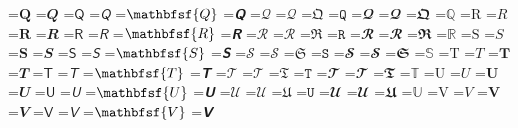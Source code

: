 \documentclass{article}
\begin{document}
=\hbox{$\mathbf{Q}$}
=\hbox{$\mathbfit{Q}$}
=\hbox{$\mathsf{Q}$}
=\hbox{$\mathsfit{Q}$}
=\hbox{$\mathbfsf{Q}$}
=\hbox{$\mathbfsfit{Q}$}
=\hbox{$\mathcal{Q}$}
=\hbox{$\mathscr{Q}$}
=\hbox{$\mathfrak{Q}$}
=\hbox{$\mathtt{Q}$}
=\hbox{$\mathbfcal{Q}$}
=\hbox{$\mathbfscr{Q}$}
=\hbox{$\mathbffrak{Q}$}
=\hbox{$\mathbb{Q}$}
=\hbox{$\mathrm{R}$}
=\hbox{$\mathit{R}$}
=\hbox{$\mathbf{R}$}
=\hbox{$\mathbfit{R}$}
=\hbox{$\mathsf{R}$}
=\hbox{$\mathsfit{R}$}
=\hbox{$\mathbfsf{R}$}
=\hbox{$\mathbfsfit{R}$}
=\hbox{$\mathcal{R}$}
=\hbox{$\mathscr{R}$}
=\hbox{$\mathfrak{R}$}
=\hbox{$\mathtt{R}$}
=\hbox{$\mathbfcal{R}$}
=\hbox{$\mathbfscr{R}$}
=\hbox{$\mathbffrak{R}$}
=\hbox{$\mathbb{R}$}
=\hbox{$\mathrm{S}$}
=\hbox{$\mathit{S}$}
=\hbox{$\mathbf{S}$}
=\hbox{$\mathbfit{S}$}
=\hbox{$\mathsf{S}$}
=\hbox{$\mathsfit{S}$}
=\hbox{$\mathbfsf{S}$}
=\hbox{$\mathbfsfit{S}$}
=\hbox{$\mathcal{S}$}
=\hbox{$\mathscr{S}$}
=\hbox{$\mathfrak{S}$}
=\hbox{$\mathtt{S}$}
=\hbox{$\mathbfcal{S}$}
=\hbox{$\mathbfscr{S}$}
=\hbox{$\mathbffrak{S}$}
=\hbox{$\mathbb{S}$}
=\hbox{$\mathrm{T}$}
=\hbox{$\mathit{T}$}
=\hbox{$\mathbf{T}$}
=\hbox{$\mathbfit{T}$}
=\hbox{$\mathsf{T}$}
=\hbox{$\mathsfit{T}$}
=\hbox{$\mathbfsf{T}$}
=\hbox{$\mathbfsfit{T}$}
=\hbox{$\mathcal{T}$}
=\hbox{$\mathscr{T}$}
=\hbox{$\mathfrak{T}$}
=\hbox{$\mathtt{T}$}
=\hbox{$\mathbfcal{T}$}
=\hbox{$\mathbfscr{T}$}
=\hbox{$\mathbffrak{T}$}
=\hbox{$\mathbb{T}$}
=\hbox{$\mathrm{U}$}
=\hbox{$\mathit{U}$}
=\hbox{$\mathbf{U}$}
=\hbox{$\mathbfit{U}$}
=\hbox{$\mathsf{U}$}
=\hbox{$\mathsfit{U}$}
=\hbox{$\mathbfsf{U}$}
=\hbox{$\mathbfsfit{U}$}
=\hbox{$\mathcal{U}$}
=\hbox{$\mathscr{U}$}
=\hbox{$\mathfrak{U}$}
=\hbox{$\mathtt{U}$}
=\hbox{$\mathbfcal{U}$}
=\hbox{$\mathbfscr{U}$}
=\hbox{$\mathbffrak{U}$}
=\hbox{$\mathbb{U}$}
=\hbox{$\mathrm{V}$}
=\hbox{$\mathit{V}$}
=\hbox{$\mathbf{V}$}
=\hbox{$\mathbfit{V}$}
=\hbox{$\mathsf{V}$}
=\hbox{$\mathsfit{V}$}
=\hbox{$\mathbfsf{V}$}
=\hbox{$\mathbfsfit{V}$}
\end{document}
